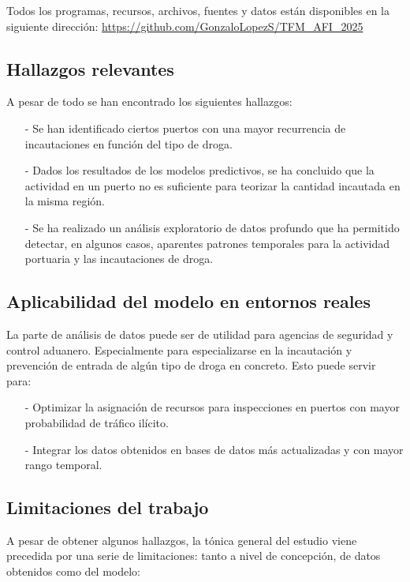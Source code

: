 \documentclass[12pt]{article}
\begin{document}
Todos los programas, recursos, archivos, fuentes y datos están disponibles en la siguiente dirección:
\url{https://github.com/GonzaloLopezS/TFM_AFI_2025}

	\subsection{Hallazgos relevantes}
	A pesar de todo se han encontrado los siguientes hallazgos:
	\begin{itemize}
		\item [-] Se han identificado ciertos puertos con una mayor recurrencia de incautaciones en función del tipo de droga.
		\item [-] Dados los resultados de los modelos predictivos, se ha concluido que la actividad en un puerto no es suficiente para teorizar la cantidad incautada en la misma región.
		\item [-] Se ha realizado un análisis exploratorio de datos profundo que ha permitido detectar, en algunos casos, aparentes patrones temporales para la actividad portuaria y las incautaciones de droga.
	\end{itemize}
	
	\subsection{Aplicabilidad del modelo en entornos reales}
	La parte de análisis de datos puede ser de utilidad para agencias de seguridad y control aduanero. Especialmente para especializarse en la incautación y prevención de entrada de algún tipo de droga en concreto. Esto puede servir para:
	\begin{itemize}
		\item [-] Optimizar la asignación de recursos para inspecciones en puertos con mayor probabilidad de tráfico ilícito.
		\item [-] Integrar los datos obtenidos en bases de datos más actualizadas y con mayor rango temporal.
	\end{itemize}
	
	\subsection{Limitaciones del trabajo}
	A pesar de obtener algunos hallazgos, la tónica general del estudio viene precedida por una serie de limitaciones: tanto a nivel de concepción, de datos obtenidos como del modelo:
	
\end{document}

